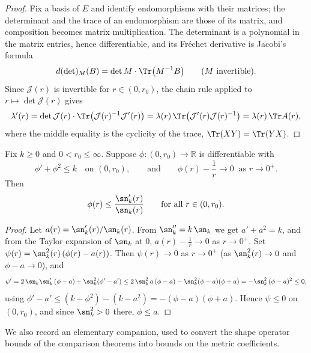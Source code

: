 \begin{proof}
\sketch
{}
\leanok
Fix a basis of $E$ and identify endomorphisms with their matrices; the
determinant and the trace of an endomorphism are those of its matrix, and
composition becomes matrix multiplication. The determinant is a polynomial
in the matrix entries, hence differentiable, and its Fréchet derivative is
Jacobi's formula
$$d(\det)_M(B)=\det M\cdot\Tr\bigl(M^{-1}B\bigr)\qquad(M\ \text{invertible}).$$
Since ${\mathcal J}(r)$ is invertible for $r\in(0,r_0)$, the chain rule
applied to $r\mapsto\det{\mathcal J}(r)$ gives
$$\lambda'(r)=\det{\mathcal J}(r)\cdot
\Tr\bigl({\mathcal J}(r)^{-1}{\mathcal J}'(r)\bigr)
=\lambda(r)\,\Tr\bigl({\mathcal J}'(r){\mathcal J}(r)^{-1}\bigr)
=\lambda(r)\,\Tr A(r),$$
where the middle equality is the cyclicity of the trace,
$\Tr(XY)=\Tr(YX)$.
\end{proof}

\begin{lemma}
\label{lem:scalar-riccati-comparison}
\leanok



Fix $k\ge 0$ and $0<r_0\le\infty$. Suppose $\phi\colon
(0,r_0)\to\mathbb{R}$ is differentiable with
$$\phi'+\phi^2\le k\quad\text{on }(0,r_0),\qquad\text{and}\qquad
\phi(r)-\frac1r\to0\ \text{ as } r\to0^+.$$
Then
$$\phi(r)\le\frac{\sn_k'(r)}{\sn_k(r)}\qquad\text{for all }r\in
(0,r_0).$$
\end{lemma}

\begin{proof}
\sketch
{}
\leanok
Let $a(r)=\sn_k'(r)/\sn_k(r)$. From $\sn_k''=k\,\sn_k$ we get
$a'+a^2=k$, and from the Taylor expansion of $\sn_k$ at $0$,
$a(r)-\frac1r\to0$ as $r\to0^+$. Set
$\psi(r)=\sn_k^2(r)\left(\phi(r)-a(r)\right)$. Then
$\psi(r)\to0$ as $r\to0^+$ (as $\sn_k^2(r)\to 0$ and $\phi-a\to0$),
and
$$\psi'=2\,\sn_k\sn_k'\,(\phi-a)+\sn_k^2(\phi'-a')
\le 2\,\sn_k^2\,a\,(\phi-a)-\sn_k^2(\phi-a)(\phi+a)
=-\sn_k^2\,(\phi-a)^2\le0,$$
using $\phi'-a'\le(k-\phi^2)-(k-a^2)=-(\phi-a)(\phi+a)$. Hence
$\psi\le0$ on $(0,r_0)$, and since $\sn_k^2>0$ there,
$\phi\le a$.
\end{proof}

We also record an elementary companion, used to convert the shape
operator bounds of the comparison theorems into bounds on the metric
coefficients.

